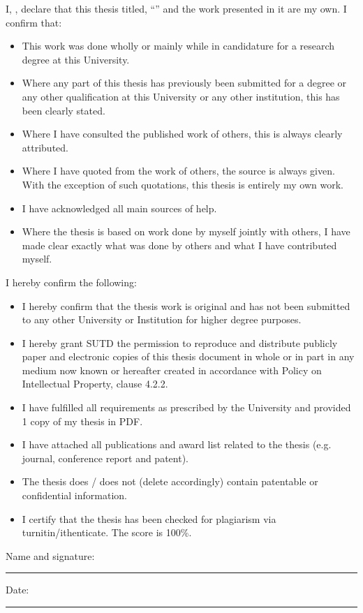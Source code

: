 \documentclass[
11pt, %
oneside, %
english, %
singlespacing, %
parskip, %
headsepline, %
]{MastersDoctoralThesis} %
\theoremstyle{definition}
\newcommand{\0}{{0_\TheCategoryOfSets}}
\newcommand{\1}{{1_\TheCategoryOfSets}}
\begin{document}
\begin{declaration}
\addchaptertocentry{\authorshipname}

\noindent I, \authorname, declare that this thesis titled, \enquote{\ttitle} and the work presented in it are my own. I confirm that:

\begin{itemize}
\item This work was done wholly or mainly while in candidature for a research degree at this University.
\item Where any part of this thesis has previously been submitted for a degree or any other qualification at this University or any other institution, this has been clearly stated.
\item Where I have consulted the published work of others, this is always clearly attributed.
\item Where I have quoted from the work of others, the source is always given. With the exception of such quotations, this thesis is entirely my own work.
\item I have acknowledged all main sources of help.
\item Where the thesis is based on work done by myself jointly with others, I have made clear exactly what was done by others and what I have contributed myself.\\
\end{itemize}

I hereby confirm the following: 
\begin{itemize}
\item I hereby confirm that the thesis work is original and has not been submitted to any other University or Institution for higher degree purposes.
\item I hereby grant SUTD the permission to reproduce and distribute publicly paper and electronic copies of this thesis document in whole or in part in any medium now known or hereafter created in accordance with Policy on Intellectual Property, clause 4.2.2.
\item I have fulfilled all requirements as prescribed by the University and provided 1 copy of my thesis in PDF.
\item I have attached all publications and award list related to the thesis (e.g. journal, conference report and patent).
\item The thesis does / does not (delete accordingly) contain patentable or confidential information.
\item I certify that the thesis has been checked for plagiarism via turnitin/ithenticate. The score is 100\%.
\end{itemize}

\noindent Name and signature:\\
\rule[0.5em]{25em}{0.5pt} %

\noindent Date:\\
\rule[0.5em]{25em}{0.5pt} %
\end{declaration}
\end{document}
